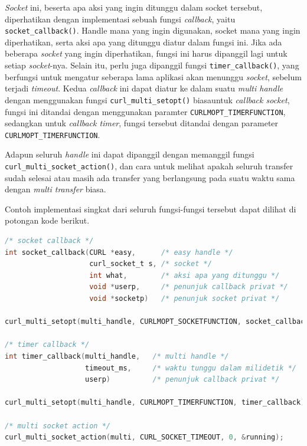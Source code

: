 \documentclass[a4paper,twoside]{article}
\begin{document}
\begin{enumerate}
\textit{Socket} ini, beserta apa aksi yang ingin ditunggu dalam socket tersebut, diperhatikan dengan implementasi sebuah fungsi \textit{callback}, yaitu \verb|socket_callback()|. Handle mana yang ingin digunakan, socket mana yang ingin diperhatikan, serta aksi apa yang ditunggu diatur dalam fungsi ini. Jika ada beberapa \textit{socket} yang ingin diperhatikan, fungsi ini harus dipanggil lagi untuk setiap \textit{socket}-nya. Selain itu, perlu juga dipanggil fungsi \verb|timer_callback()|, yang berfungsi untuk mengatur seberapa lama aplikasi akan menunggu \textit{socket}, sebelum terjadi \textit{timeout}. Kedua \textit{callback} ini dapat diatur ke dalam suatu \textit{multi handle} dengan menggunakan fungsi \verb|curl_multi_setopt()| biasa\textemdash untuk \textit{callback socket}, fungsi ini ditandai dengan menggunakan paramter \verb|CURLMOPT_TIMERFUNCTION|, sedangkan untuk \textit{callback timer}, fungsi tersebut ditandai dengan parameter \verb|CURLMOPT_TIMERFUNCTION|.

Adapun seluruh \textit{handle} ini dapat dipanggil dengan memanggil fungsi \verb|curl_multi_socket_action()|, dan cara untuk melihat apakah seluruh transfer sudah selesai atau masih ada transfer yang berlangsung pada suatu waktu sama dengan \textit{multi transfer} biasa.

Contoh implementasi singkat dari seluruh fungsi-fungsi tersebut dapat dilihat di potongan kode berikut.

\begin{lstlisting}[language=C, caption=Kumpulan implementasi pengunaan \textit{multi socket handle} curl, label=code:curl-usage-multisocket]
/* socket callback */
int socket_callback(CURL *easy,      /* easy handle */
                    curl_socket_t s, /* socket */
                    int what,        /* aksi apa yang ditunggu */
                    void *userp,     /* penunjuk callback privat */
                    void *socketp)   /* penunjuk socket privat */

curl_multi_setopt(multi_handle, CURLMOPT_SOCKETFUNCTION, socket_callback);

/* timer callback */
int timer_callback(multi_handle,   /* multi handle */
                   timeout_ms,     /* waktu tunggu dalam milidetik */
                   userp)          /* penunjuk callback privat */

curl_multi_setopt(multi_handle, CURLMOPT_TIMERFUNCTION, timer_callback);

/* multi socket action */
curl_multi_socket_action(multi, CURL_SOCKET_TIMEOUT, 0, &running);
\end{lstlisting}


\end{enumerate}
\end{document}
